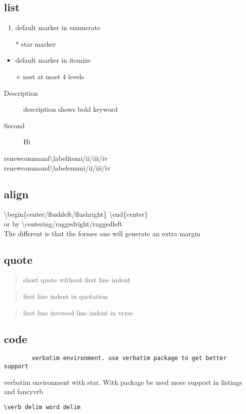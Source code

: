 \documentclass{article}
\begin{document}
\subsection{list}
    \begin{enumerate}
        \item default marker in enumerate
        \item[*] star marker 
    \end{enumerate}
    \begin{itemize}
        \item default marker in itemize
        \item[+] nest at most 4 levels
    \end{itemize}
    \begin{description}
        \item[Description] description shows bold keyword
        \item[Second] Hi
    \end{description}
    renewcommand{\textbackslash labelitemi/ii/iii/iv}\\
    renewcommand{\textbackslash labelenumi/ii/iii/iv}
\subsection{align}
    \textbackslash begin\{center/flushleft/flushright\} \textbackslash end\{center\} \\
    or by \textbackslash centering/raggedright/raggedleft \\
    The different is that the former one will generate an extra margin
\subsection{quote}
    \begin{quote}
        short quote without first line indent
    \end{quote}
    \begin{quotation}
        first line indent in quotation
    \end{quotation}
    \begin{verse}
        first line inversed line indent in verse
    \end{verse}
\subsection{code}
    \begin{verbatim}
        verbatim environment. use verbatim package to get better support
    \end{verbatim}
    \begin{verbatim*}
        verbatim environment with star. With package  be used
        more support in listings and fancyvrb
    \end{verbatim*}
    \verb|\verb delim word delim|
\end{document}
